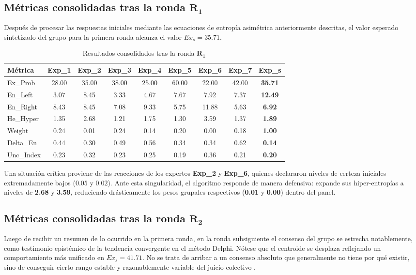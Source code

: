 \documentclass[11pt,a4paper]{article}
\begin{document}
\subsection{Métricas consolidadas tras la ronda $\mathbf{R_1}$}
Después de procesar las respuestas iniciales mediante las ecuaciones de entropía asimétrica anteriormente descritas, el valor esperado sintetizado del grupo para la primera ronda alcanza el valor $Ex_s = 35.71$.

\begin{table}[htbp]
\centering
\small
\begin{tabular}{lcccccccc}
\toprule
\textbf{Métrica} & \textbf{Exp\_1} & \textbf{Exp\_2} & \textbf{Exp\_3} & \textbf{Exp\_4} & \textbf{Exp\_5} & \textbf{Exp\_6} & \textbf{Exp\_7} & \textbf{Exp\_s} \\
\midrule
Ex\_Prob   & 28.00 & 35.00 & 38.00 & 25.00 & 60.00 & 22.00 & 42.00 & \textbf{35.71} \\
En\_Left   & 3.07  & 8.45  & 3.33  & 4.67  & 7.67  & 7.92  & 7.37  & \textbf{12.49} \\
En\_Right  & 8.43  & 8.45  & 7.08  & 9.33  & 5.75  & 11.88 & 5.63  & \textbf{6.92}  \\
He\_Hyper  & 1.35  & 2.68  & 1.21  & 1.75  & 1.30  & 3.59  & 1.37  & \textbf{1.89}  \\
Weight     & 0.24  & 0.01  & 0.24  & 0.14  & 0.20  & 0.00  & 0.18  & \textbf{1.00}  \\
Delta\_En  & 0.44  & 0.30  & 0.49  & 0.56  & 0.34  & 0.34  & 0.62  & \textbf{0.14}  \\
Unc\_Index & 0.23  & 0.32  & 0.23  & 0.25  & 0.19  & 0.36  & 0.21  & \textbf{0.20}  \\
\bottomrule
\end{tabular}
\caption{Resultados consolidados tras la ronda $\mathbf{R_1}$}
\end{table}

Una situación crítica proviene de las reacciones de los expertos \textbf{Exp\_2} y \textbf{Exp\_6}, quienes declararon niveles de certeza iniciales extremadamente bajos ($0.05$ y $0.02$). Ante esta singularidad, el algoritmo responde de manera defensiva: expande sus hiper-entropías a niveles de \textbf{2.68} y \textbf{3.59}, reduciendo drásticamente los pesos grupales respectivos (\textbf{0.01} y \textbf{0.00}) dentro del panel.

\subsection{Métricas consolidadas tras la ronda $\mathbf{R_2}$}
Luego de recibir un resumen de lo ocurrido en la primera ronda, en la ronda subsiguiente el consenso del grupo se estrecha notablemente, como testimonio epistémico de la tendencia convergente en el método Delphi. Nótese que el centroide se desplaza reflejando un comportamiento más unificado en $Ex_s = 41.71$. No se trata de arribar a un consenso absoluto que generalmente no tiene por qué existir, sino de conseguir cierto rango estable y razonablemente variable del juicio colectivo \cite{cruz2009}.
\end{document}
